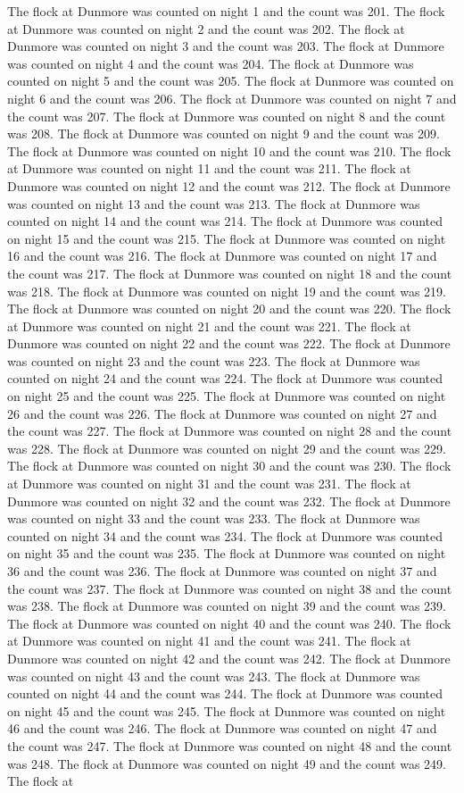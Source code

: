 The flock at Dunmore was counted on night 1 and the count was 201. The flock at Dunmore was counted on night 2 and the count was 202. The flock at Dunmore was counted on night 3 and the count was 203. The flock at Dunmore was counted on night 4 and the count was 204. The flock at Dunmore was counted on night 5 and the count was 205. The flock at Dunmore was counted on night 6 and the count was 206. The flock at Dunmore was counted on night 7 and the count was 207. The flock at Dunmore was counted on night 8 and the count was 208. The flock at Dunmore was counted on night 9 and the count was 209. The flock at Dunmore was counted on night 10 and the count was 210. The flock at Dunmore was counted on night 11 and the count was 211. The flock at Dunmore was counted on night 12 and the count was 212. The flock at Dunmore was counted on night 13 and the count was 213. The flock at Dunmore was counted on night 14 and the count was 214. The flock at Dunmore was counted on night 15 and the count was 215. The flock at Dunmore was counted on night 16 and the count was 216. The flock at Dunmore was counted on night 17 and the count was 217. The flock at Dunmore was counted on night 18 and the count was 218. The flock at Dunmore was counted on night 19 and the count was 219. The flock at Dunmore was counted on night 20 and the count was 220. The flock at Dunmore was counted on night 21 and the count was 221. The flock at Dunmore was counted on night 22 and the count was 222. The flock at Dunmore was counted on night 23 and the count was 223. The flock at Dunmore was counted on night 24 and the count was 224. The flock at Dunmore was counted on night 25 and the count was 225. The flock at Dunmore was counted on night 26 and the count was 226. The flock at Dunmore was counted on night 27 and the count was 227. The flock at Dunmore was counted on night 28 and the count was 228. The flock at Dunmore was counted on night 29 and the count was 229. The flock at Dunmore was counted on night 30 and the count was 230. The flock at Dunmore was counted on night 31 and the count was 231. The flock at Dunmore was counted on night 32 and the count was 232. The flock at Dunmore was counted on night 33 and the count was 233. The flock at Dunmore was counted on night 34 and the count was 234. The flock at Dunmore was counted on night 35 and the count was 235. The flock at Dunmore was counted on night 36 and the count was 236. The flock at Dunmore was counted on night 37 and the count was 237. The flock at Dunmore was counted on night 38 and the count was 238. The flock at Dunmore was counted on night 39 and the count was 239. The flock at Dunmore was counted on night 40 and the count was 240. The flock at Dunmore was counted on night 41 and the count was 241. The flock at Dunmore was counted on night 42 and the count was 242. The flock at Dunmore was counted on night 43 and the count was 243. The flock at Dunmore was counted on night 44 and the count was 244. The flock at Dunmore was counted on night 45 and the count was 245. The flock at Dunmore was counted on night 46 and the count was 246. The flock at Dunmore was counted on night 47 and the count was 247. The flock at Dunmore was counted on night 48 and the count was 248. The flock at Dunmore was counted on night 49 and the count was 249. The flock at 